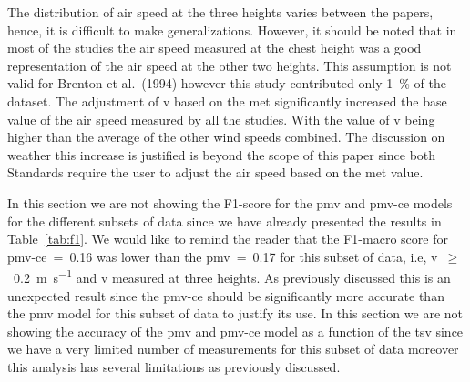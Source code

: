 The distribution of air speed at the three heights varies between the papers, hence, it is difficult to make generalizations.
However, it should be noted that in most of the studies the air speed measured at the chest height was a good representation of the air speed at the other two heights.
This assumption is not valid for Brenton et al.\ (1994) however this study contributed only \qty{1}{\percent} of the dataset.
The adjustment of \ac{v} based on the \ac{met} significantly increased the base value of the air speed measured by all the studies.
With the value of \ac{v} being  higher than the average of the other wind speeds combined.
The discussion on weather this increase is justified is beyond the scope of this paper since both Standards require the user to adjust the air speed based on the \ac{met} value.

In this section we are not showing the F1-score for the \ac{pmv} and \ac{pmv-ce} models for the different subsets of data since we have already presented the results in Table~\ref{tab:f1}.
We would like to remind the reader that the F1-macro score for \ac{pmv-ce}~=~\num{.16} was lower than the \ac{pmv}~=~\num{.17} for this subset of data, i.e, \ac{v}~$\geq$~\qty{0.2}{\m\per\s} and \ac{v} measured at three heights.
As previously discussed this is an unexpected result since the \ac{pmv-ce} should be significantly more accurate than the \ac{pmv} model for this subset of data to justify its use.
In this section we are not showing the accuracy of the \ac{pmv} and \ac{pmv-ce} model as a function of the \ac{tsv} since we have a very limited number of measurements for this subset of data moreover this analysis has several limitations as previously discussed.


